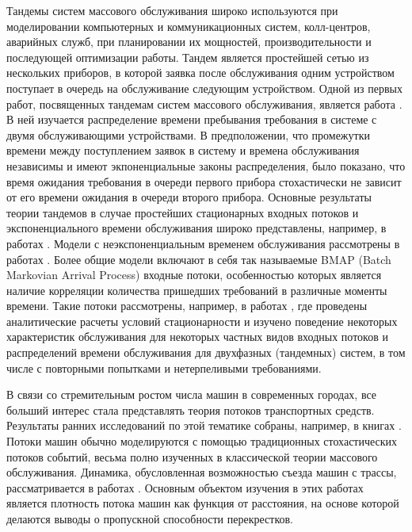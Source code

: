 
  
Тандемы систем массового обслуживания широко используются при моделировании компьютерных и коммуникационных систем, колл-центров, аварийных служб, при планировании их мощностей, производительности и последующей оптимизации работы. 
Тандем является простейшей сетью из нескольких приборов, в которой заявка после обслуживания одним устройством  поступает в очередь на обслуживание следующим устройством.
Одной из первых работ, посвященных тандемам систем массового обслуживания, является работа \cite{reich}. В ней изучается распределение времени пребывания требования в системе с двумя обслуживающими устройствами. В предположении, что промежутки времени между поступлением заявок в систему и времена обслуживания независимы и имеют экпоненциальные законы распределения, было показано, что время ожидания требования в очереди первого прибора стохастически не зависит от его времени ожидания в очереди второго прибора. Основные результаты теории тандемов в случае простейших стационарных входных потоков и экспоненциального времени обслуживания широко представлены, например, в работах \cite{Balsamo, GnedenkoKonig}. Модели с неэкспоненциальным временем обслуживания рассмотрены в работах \cite{Gomez:1,Gomez:2,Gomez:3}. Более общие модели включают в себя так называемые BMAP (Batch Markovian Arrival Process) входные потоки, особенностью которых является наличие корреляции количества пришедших требований в различные моменты времени. Такие потоки рассмотрены, например, в работах \cite{KlimenokDudin:2005,KlimenokDudin:2004,Klimenok:2010,Klimenok:2011,Klimenok:2015 }, где проведены аналитические расчеты условий стационарности и изучено поведение некоторых характеристик обслуживания для некоторых частных видов входных потоков и распределений времени обслуживания для двухфазных (тандемных) систем, в том числе с повторными попытками и нетерпеливыми требованиями.  

В связи со стремительным ростом числа машин в современных городах, все больший интерес стала представлять теория потоков транспортных средств. Результаты ранних исследований по этой тематике собраны, например, в книгах \cite{Haight:1963, Drew:1968,Inose}. Потоки машин обычно моделируются с помощью традиционных стохастических потоков событий, весьма полно изученных в классической теории массового обслуживания.  Динамика, обусловленная возможностью съезда машин с трассы, рассматривается в работах \cite{AfanasyevaBulinskaya:2013:1,AfanasyevaBulinskaya:2010,AfanasyevaBulinskaya:2013:2}. Основным объектом изучения в этих работах является плотность потока машин как функция от расстояния, на основе которой делаются выводы о пропускной способности перекрестков.


